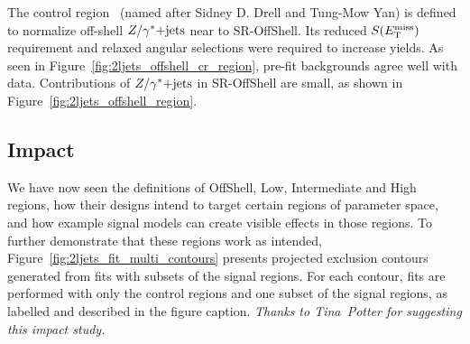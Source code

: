 The control region \crdy\ (named after Sidney D. Drell and Tung-Mow Yan) is
defined to normalize off-shell $Z/\gamma^*\mathrm{+jets}$ near to SR-OffShell.
Its reduced $S(E_\mathrm{T}^\mathrm{miss})$ requirement and relaxed angular selections were required
to increase yields.
As seen in Figure~\ref{fig:2ljets_offshell_cr_region}, pre-fit backgrounds
agree well with data.
Contributions of $Z/\gamma^*\mathrm{+jets}$ in SR-OffShell are small, as shown in
Figure~\ref{fig:2ljets_offshell_region}.


\subsection{Impact}
\label{sec:2ljets_imapct}
We have now seen the definitions of OffShell, Low, Intermediate and High
regions, how their designs intend to target certain regions of parameter space,
and how example signal models can create visible effects in those regions.
To further demonstrate that these regions work as intended,
Figure~\ref{fig:2ljets_fit_multi_contours} presents projected exclusion
contours generated from fits with subsets of the signal regions.
For each contour, fits are performed with only the control regions and one
subset of the signal regions, as labelled and described in the figure caption.
\emph{Thanks to Tina~Potter for suggesting this impact study.}

